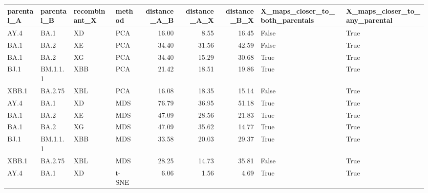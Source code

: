 \begin{tabular}{llllrrrll}
\toprule
parental\_A & parental\_B & recombinant\_X & method &  distance\_A\_B &  distance\_A\_X &  distance\_B\_X &  X\_maps\_closer\_to\_both\_parentals &  X\_maps\_closer\_to\_any\_parental \\
\midrule
      AY.4 &       BA.1 &            XD &    PCA &         16.00 &          8.55 &         16.45 &                            False &                           True \\
      BA.1 &       BA.2 &            XE &    PCA &         34.40 &         31.56 &         42.59 &                            False &                           True \\
      BA.1 &       BA.2 &            XG &    PCA &         34.40 &         15.29 &         30.68 &                             True &                           True \\
      BJ.1 &   BM.1.1.1 &           XBB &    PCA &         21.42 &         18.51 &         19.86 &                             True &                           True \\
     XBB.1 &    BA.2.75 &           XBL &    PCA &         16.08 &         18.35 &         15.14 &                            False &                           True \\
      AY.4 &       BA.1 &            XD &    MDS &         76.79 &         36.95 &         51.18 &                             True &                           True \\
      BA.1 &       BA.2 &            XE &    MDS &         47.09 &         28.56 &         21.83 &                             True &                           True \\
      BA.1 &       BA.2 &            XG &    MDS &         47.09 &         35.62 &         14.77 &                             True &                           True \\
      BJ.1 &   BM.1.1.1 &           XBB &    MDS &         33.58 &         20.03 &         29.37 &                             True &                           True \\
     XBB.1 &    BA.2.75 &           XBL &    MDS &         28.25 &         14.73 &         35.81 &                            False &                           True \\
      AY.4 &       BA.1 &            XD &  t-SNE &          6.06 &          1.56 &          4.69 &                             True &                           True \\

\end{tabular}
